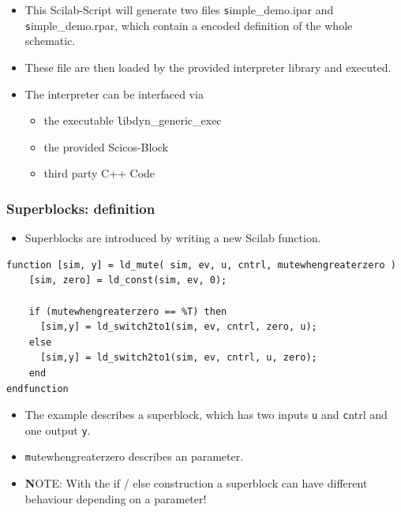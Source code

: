 \documentclass[serif,9pt,xcolor=dvipsnames]{beamer}
\begin{document}
\begin{frame}[fragile]
 \begin{itemize}
  \item This Scilab-Script will generate two files {\texttt simple\_demo.ipar} and {\texttt simple\_demo.rpar}, which contain a encoded definition of the whole schematic.
\item These file are then loaded by the provided interpreter library and executed.
\item The interpreter can be interfaced via
  \begin{itemize}
   \item the executable {\texttt libdyn\_generic\_exec}
   \item the provided Scicos-Block
   \item third party C++ Code
  \end{itemize}
 \end{itemize}

\end{frame}


\begin{frame}[fragile]
 \frametitle{Superblocks: definition}
 
\begin{itemize}
 \item Superblocks are introduced by writing a new Scilab function.
\end{itemize}

{\small 
\begin{lstlisting} 
function [sim, y] = ld_mute( sim, ev, u, cntrl, mutewhengreaterzero )
    [sim, zero] = ld_const(sim, ev, 0);
    
    if (mutewhengreaterzero == %T) then
      [sim,y] = ld_switch2to1(sim, ev, cntrl, zero, u);
    else
      [sim,y] = ld_switch2to1(sim, ev, cntrl, u, zero);
    end
endfunction
\end{lstlisting}}

\begin{itemize}
 \item The example describes a superblock, which has two inputs {\texttt u} and {\texttt cntrl} and one output {\texttt y}.
\item {\texttt mutewhengreaterzero} describes an parameter.
\item {\textbf NOTE}: With the if / else construction a superblock can have different behaviour depending on a parameter!
\end{itemize}


\end{frame}
\end{document}
